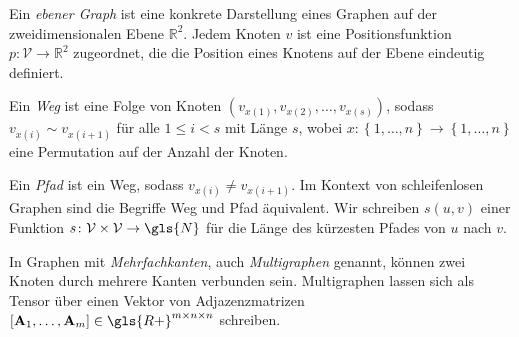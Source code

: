 Ein \emph{ebener Graph} ist eine konkrete Darstellung eines Graphen auf der zweidimensionalen Ebene $\mathbb{R}^2$.
Jedem Knoten $v$ ist eine Positionsfunktion $p \colon \mathcal{V} \to \mathbb{R}^2$ zugeordnet, die die Position eines Knotens auf der Ebene eindeutig definiert.

Ein \emph{Weg} ist eine Folge von Knoten $\left( v_{x\left(1\right)}, v_{x\left(2\right)}, \ldots, v_{x\left(s\right)} \right)$, sodass $v_{x\left(i\right)} \sim v_{x\left(i+1\right)}$ für alle $1 \leq i < s$ mit Länge $s$, wobei $x \colon \left\{ 1, \ldots, n \right\} \to \left\{ 1, \ldots, n \right\}$ eine Permutation auf der Anzahl der Knoten.

Ein \emph{Pfad} ist ein Weg, sodass $v_{x\left(i\right)} \neq v_{x\left(i+1\right)}$.
Im Kontext von schleifenlosen Graphen sind die Begriffe Weg und Pfad äquivalent.
Wir schreiben $s\left(u, v\right)$ einer Funktion $s \colon \mathcal{V} \times \mathcal{V} \to \gls{N}$ für die Länge des kürzesten Pfades von $u$ nach $v$.

In Graphen mit \emph{Mehrfachkanten}, auch \emph{Multigraphen} genannt, können zwei Knoten durch mehrere Kanten verbunden sein.
Multigraphen lassen sich als Tensor über einen Vektor von Adjazenzmatrizen $\left[\mathbf{A}_1, \ldots, \mathbf{A}_m\right] \in \gls{R+}^{m \times n \times n}$ schreiben.
